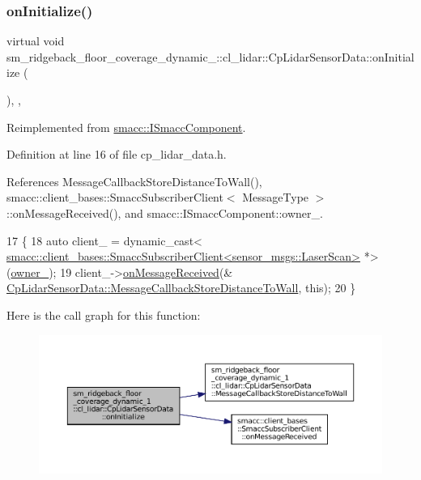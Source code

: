 \subsubsection{\texorpdfstring{on\+Initialize()}{onInitialize()}}
{\footnotesize\ttfamily virtual void sm\+\_\+ridgeback\+\_\+floor\+\_\+coverage\+\_\+dynamic\+\_\+::cl\+\_\+lidar\+::\+Cp\+Lidar\+Sensor\+Data\+::on\+Initialize (\begin{DoxyParamCaption}{ }\end{DoxyParamCaption})\hspace{0.3cm}{\ttfamily [inline]}, {\ttfamily [override]}, {\ttfamily [virtual]}}



Reimplemented from \hyperlink{classsmacc_1_1ISmaccComponent_ae6f71d008db12553912e9436184b9e65}{smacc\+::\+I\+Smacc\+Component}.



Definition at line 16 of file cp\+\_\+lidar\+\_\+data.\+h.



References Message\+Callback\+Store\+Distance\+To\+Wall(), smacc\+::client\+\_\+bases\+::\+Smacc\+Subscriber\+Client$<$ Message\+Type $>$\+::on\+Message\+Received(), and smacc\+::\+I\+Smacc\+Component\+::owner\+\_\+.


\begin{DoxyCode}
17   \{
18     \textcolor{keyword}{auto} client\_ = \textcolor{keyword}{dynamic\_cast<}
      \hyperlink{classsmacc_1_1client__bases_1_1SmaccSubscriberClient}{smacc::client\_bases::SmaccSubscriberClient<sensor\_msgs::LaserScan>}
       *\textcolor{keyword}{>}(\hyperlink{classsmacc_1_1ISmaccComponent_a909590e672450ce0eb0d8facb45c737a}{owner\_});
19     client\_->\hyperlink{classsmacc_1_1client__bases_1_1SmaccSubscriberClient_a4f02251e3a161fb6d802b154b1081f18}{onMessageReceived}(&
      \hyperlink{classsm__ridgeback__floor__coverage__dynamic__1_1_1cl__lidar_1_1CpLidarSensorData_a92a1f686f790487c60bdfd6b04b84b75}{CpLidarSensorData::MessageCallbackStoreDistanceToWall},
       \textcolor{keyword}{this});
20   \}
\end{DoxyCode}
Here is the call graph for this function\+:
\nopagebreak
\begin{figure}[H]
\begin{center}
\leavevmode
\includegraphics[width=350pt]{classsm__ridgeback__floor__coverage__dynamic__1_1_1cl__lidar_1_1CpLidarSensorData_a36e459ab99589f934a85a7106b409d9a_cgraph}
\end{center}
\end{figure}


